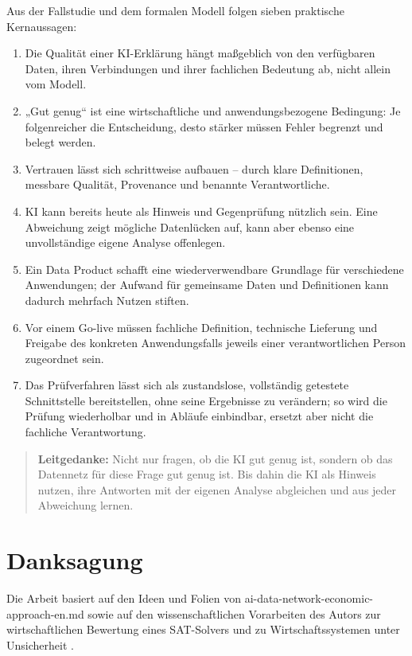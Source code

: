 \documentclass[a4paper,12pt]{article}
\theoremstyle{definition}
\begin{document}
Aus der Fallstudie und dem formalen Modell folgen sieben praktische Kernaussagen:
\begin{enumerate}
\item Die Qualität einer KI-Erklärung hängt maßgeblich von den verfügbaren Daten, ihren Verbindungen und ihrer fachlichen Bedeutung ab, nicht allein vom Modell.
\item „Gut genug“ ist eine wirtschaftliche und anwendungsbezogene Bedingung: Je folgenreicher die Entscheidung, desto stärker müssen Fehler begrenzt und belegt werden.
\item Vertrauen lässt sich schrittweise aufbauen – durch klare Definitionen, messbare Qualität, Provenance und benannte Verantwortliche.
\item KI kann bereits heute als Hinweis und Gegenprüfung nützlich sein. Eine Abweichung zeigt mögliche Datenlücken auf, kann aber ebenso eine unvollständige eigene Analyse offenlegen.
\item Ein Data Product schafft eine wiederverwendbare Grundlage für verschiedene Anwendungen; der Aufwand für gemeinsame Daten und Definitionen kann dadurch mehrfach Nutzen stiften.
\item Vor einem Go-live müssen fachliche Definition, technische Lieferung und Freigabe des konkreten Anwendungsfalls jeweils einer verantwortlichen Person zugeordnet sein.
\item Das Prüfverfahren lässt sich als zustandslose, vollständig getestete Schnittstelle bereitstellen, ohne seine Ergebnisse zu verändern; so wird die Prüfung wiederholbar und in Abläufe einbindbar, ersetzt aber nicht die fachliche Verantwortung.
\end{enumerate}

\begin{quote}
\textbf{Leitgedanke:} Nicht nur fragen, ob die KI gut genug ist, sondern ob das Datennetz für diese Frage gut genug ist. Bis dahin die KI als Hinweis nutzen, ihre Antworten mit der eigenen Analyse abgleichen und aus jeder Abweichung lernen.
\end{quote}

\section*{Danksagung}
Die Arbeit basiert auf den Ideen und Folien von ai-data-network-economic-approach-en.md sowie auf den wissenschaftlichen Vorarbeiten des Autors zur wirtschaftlichen Bewertung eines SAT-Solvers und zu Wirtschaftssystemen unter Unsicherheit \cite{sat2026,uncertainty2026}.
\appendix
\end{document}

